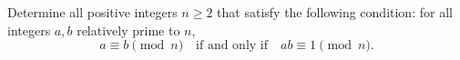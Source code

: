 Determine all positive integers $n \geq 2$ that satisfy the following condition: for all integers $a, b$ relatively prime to $n$,
\[ a \equiv b \pmod{n} \quad \text{if and only if} \quad ab \equiv 1 \pmod{n}. \]
